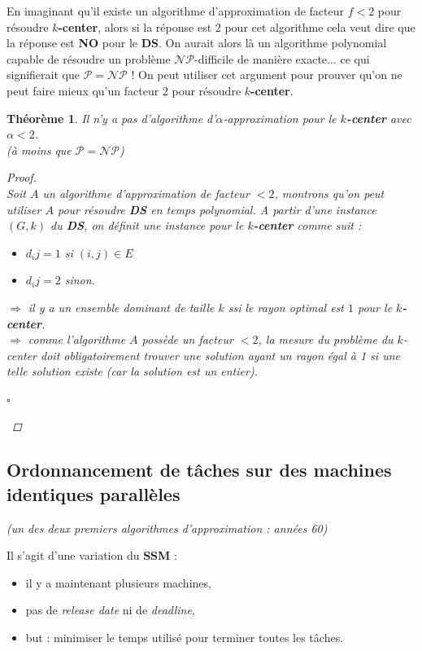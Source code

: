 \documentclass[12pt]{article}
\newcommand{\titre}[1]{\textcolor{title}{#1}}
\newcommand{\cqfd}{\begin{flushright}$\square$\end{flushright}}
\newtheorem{thm}{Th\'eor\`eme}[section]
\newtheorem{proof}{Preuve}[section]
\begin{document}
En imaginant qu'il existe un algorithme d'approximation de facteur $f < 2$ pour résoudre \textbf{$k$-center}, alors si la réponse est $2$
pour cet algorithme cela veut dire que la réponse est \textbf{NO} pour le \textbf{\titre{DS}}. On aurait alors là un algorithme
polynomial capable de résoudre un problème $\mathcal{NP}$-difficile de manière exacte$\ldots$ ce qui signifierait que $\mathcal{P=NP}$ !
On peut utiliser cet argument pour prouver qu'on ne peut faire mieux qu'un facteur $2$ pour résoudre \textbf{$k$-center}.

\begin{thm}Il n'y a pas d'algorithme d'$\alpha$-approximation pour le \textbf{$k$-center} avec $\alpha <2$.\\ (à moins que $\mathcal{P} =
\mathcal{NP}$)
\begin{proof}$ $\\
Soit $A$ un algorithme d'approximation de facteur $<2$, montrons qu'on peut utiliser $A$ pour résoudre \textbf{\titre{DS}} en temps
polynomial. A partir d'une instance $(G,k)$ du \textbf{\titre{DS}}, on définit une instance pour le \textbf{$k$-center} comme suit :
\begin{itemize}
\item [$\bigstar$]$d_ij = 1$ si $(i,j) \in E$
\item [$\bigstar$]$d_ij = 2$ sinon.
\end{itemize}
$\Rightarrow$ il y a un ensemble dominant de taille $k$ ssi le rayon optimal est $1$ pour le \textbf{$k$-center}.\\
$\Rightarrow$ comme l'algorithme $A$ possède un facteur $< 2$, la mesure du problème du $k$-center doit obligatoirement trouver une
solution ayant un rayon égal à 1 si une telle solution existe \textit{(car la solution est un entier)}.
\cqfd
\end{proof}
\end{thm}



\subsection{Ordonnancement de tâches sur des machines identiques parallèles}

\begin{flushright}\textit{(un des deux premiers algorithmes d'approximation : années 60)}\end{flushright}

Il s'agit d'une variation du \textbf{\titre{SSM}} :
\begin{itemize}
\item il y a maintenant plusieurs machines,
\item pas de \textit{release date} ni de \textit{deadline},
\item but : minimiser le temps utilisé pour terminer toutes les tâches.
\end{itemize}
\end{document}
